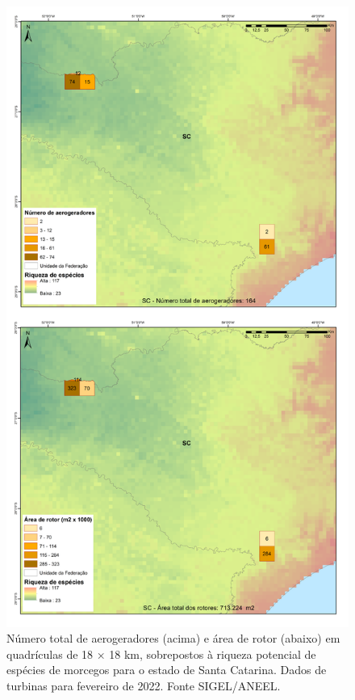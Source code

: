 \documentclass[
  oneside]{scrbook}
\begin{document}
\begin{figure}[H]

{\centering \includegraphics[width=0.75\linewidth]{imagens/cap09/Figura_9.16} 

}

\caption{Número total de aerogeradores (acima) e área de rotor (abaixo) em quadrículas de 18 × 18 km, sobrepostos à riqueza potencial de espécies de morcegos para o estado de Santa Catarina. Dados de turbinas para fevereiro de 2022. Fonte SIGEL/ANEEL.}\label{fig:81}
\end{figure}
\end{document}

